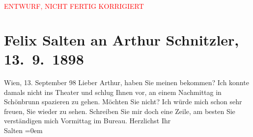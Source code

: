 
\begin{center}
            \textcolor{red}{ENTWURF, NICHT FERTIG KORRIGIERT}
                      \end{center}
            
         \renewcommand{\erwaehnteOrte}{Orte: Schlosspark Schönbrunn, Wien}
         \renewcommand{\erwaehnteWerke}{}
               \section[Felix Salten an Arthur Schnitzler, 13. 9. 1898]{ Felix Salten an Arthur Schnitzler, 13. 9. 1898}\nopagebreak{}\rehead{ }\begin{ledgroupsized}[t]{13cm}\normalsize\beginnumbering \toendnotes[C]{\smallbreak\pagebreak[2]} 
\toendnotes[C]{\smallbreak}\pstart
           \raggedleft{}{\pb} Wien, 13. September 98\pend
           \pstart
           Lieber Arthur, haben Sie meinen \label{K_L03283-1v}\label{K_L03283-1h} bekommen? Ich konnte damals
               nicht ins Theater und schlug Ihnen vor, an einem Nachmittag in Schönbrunn spazieren zu gehen. Möchten Sie nicht? Ich würde
               mich schon sehr freuen, Sie wieder zu sehen. Schreiben Sie mir doch eine Zeile, am
               besten Sie verständigen mich Vormittag im Bureau.\pend
           \pstart
           Herzlichst Ihr {\\[\baselineskip]}\spacefill\mbox{Salten}\pend
           \leftskip=0em{}
         
         \endnumbering{}\end{ledgroupsized}\begin{anhang}\end{anhang}\newcommand{\dateiname}{L03283}\newcommand{\titel}{Felix Salten an Arthur Schnitzler, 13. 9. 1898}\newcommand{\editorInnen}{Martin Anton Müller und Laura Untner}
      